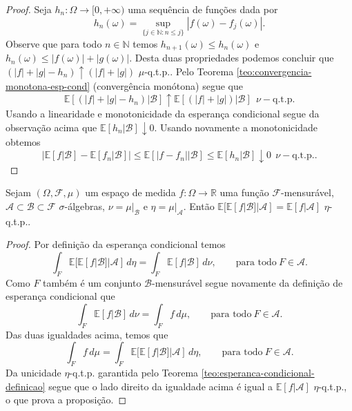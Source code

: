 \begin{proof}
Seja $h_n:\Omega\to\mathbb[0,+\infty)$ 
uma sequência de funções dada por 
\[
h_n(\omega)
=
\displaystyle\sup_{\{j\in\mathbb{N}:n\leq j\}}
|f(\omega)-f_j(\omega)|.
\]
Observe que para todo $n\in\mathbb{N}$ temos 
$h_{n+1}(\omega)\leq h_{n}(\omega)$ e 
$h_n(\omega)\leq |f(\omega)|+|g(\omega)|$. 
Desta duas propriedades podemos concluir que 
$(|f|+|g|-h_n)\uparrow (|f|+|g|)$ $\mu$-q.t.p.. 
Pelo Teorema \ref{teo:convergencia-monotona-esp-cond} 
(convergência monótona) segue que
\[
\mathbb{E}[(|f|+|g|-h_n)|\mathcal{B}]
\uparrow
 \mathbb{E}[(|f|+|g|)|\mathcal{B}]
 \ \  \nu-\text{q.t.p.}
\]
Usando a linearidade e monotonicidade da esperança 
condicional segue da observação acima que 
$\mathbb{E}[h_n|\mathcal{B}]\downarrow 0$.
Usando novamente a monotonicidade obtemos 
\[
\big|\mathbb{E}[f|\mathcal{B}]-\mathbb{E}[f_n|\mathcal{B}]  \big|
\leq
\mathbb{E}[|f-f_n||\mathcal{B}]
\leq 
\mathbb{E}[h_n|\mathcal{B}]\downarrow 0 
\ \ \nu-\text{q.t.p.}.
\]
\end{proof}



\begin{proposicao}
Sejam $(\Omega,\mathcal{F},\mu)$ um espaço 
de medida $f:\Omega\to\mathbb{R}$ uma 
função $\mathcal{F}$-mensurável, 
$\mathscr{A}\subset\mathcal{B}\subset\mathcal{F}$ 
$\sigma$-álgebras,
$\nu=\mu|_{\mathcal{B}}$ e $\eta=\mu|_{\mathscr{A}}$.
Então 
$
\mathbb{E}[\mathbb{E}[f|\mathcal{B}]|\mathscr{A}]
=
\mathbb{E}[f|\mathscr{A}]$ 
$\eta$-q.t.p..
\end{proposicao}


\begin{proof}
Por definição da esperança condicional temos 
\[
\int_{F} 
\mathbb{E}[\mathbb{E}[f|\mathcal{B}]|\mathscr{A}]
\, d\eta
=
\int_{F} \mathbb{E}[f|\mathcal{B}]\, d\nu,
\qquad\text{para todo}\ F\in\mathscr{A}.
\]
Como $F$ também é um conjunto $\mathcal{B}$-mensurável 
segue novamente da definição de esperança condicional que 
$$
\int_{F} \mathbb{E}[f|\mathcal{B}]\, d\nu
=
\int_{F} f\, d\mu,
\qquad\text{para todo}\ F\in\mathscr{A}.
$$
Das duas igualdades acima, temos que 
$$
\int_{F} f\, d\mu 
=
\int_{F} \mathbb{E}[\mathbb{E}[f|\mathcal{B}]|\mathscr{A}]
\, d\eta,
\qquad\text{para todo}\ F\in\mathscr{A}.
$$
Da unicidade $\eta$-q.t.p. garantida pelo 
Teorema \ref{teo:esperanca-condicional-definicao} segue que 
o lado direito da igualdade acima é igual a 
$\mathbb{E}[f|\mathscr{A}]$ $\eta$-q.t.p., 
o que prova a proposição.
\end{proof}